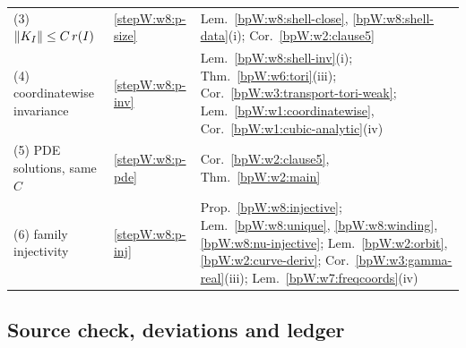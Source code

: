 \begin{center}
\begin{tabular}{@{}p{}p{}p{}@{}}
(3) $\lVert K_I\rVert\le C\,r(I)$ & \ref{stepW:w8:p-size} & Lem.~\ref{bpW:w8:shell-close}, \ref{bpW:w8:shell-data}(i); Cor.~\ref{bpW:w2:clause5}\\
(4) coordinatewise invariance & \ref{stepW:w8:p-inv} & Lem.~\ref{bpW:w8:shell-inv}(i); Thm.~\ref{bpW:w6:tori}(iii); Cor.~\ref{bpW:w3:transport-tori-weak}; Lem.~\ref{bpW:w1:coordinatewise}, Cor.~\ref{bpW:w1:cubic-analytic}(iv)\\
(5) PDE solutions, same $C$ & \ref{stepW:w8:p-pde} & Cor.~\ref{bpW:w2:clause5}, Thm.~\ref{bpW:w2:main}\\
(6) family injectivity & \ref{stepW:w8:p-inj} & Prop.~\ref{bpW:w8:injective}; Lem.~\ref{bpW:w8:unique}, \ref{bpW:w8:winding}, \ref{bpW:w8:nu-injective}; Lem.~\ref{bpW:w2:orbit}, \ref{bpW:w2:curve-deriv}; Cor.~\ref{bpW:w3:gamma-real}(iii); Lem.~\ref{bpW:w7:freqcoords}(iv)\\
\bottomrule
\end{tabular}
\end{center}

\subsection{Source check, deviations and ledger}\label{bpW:w8:check}

